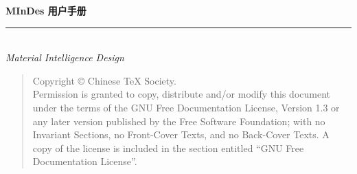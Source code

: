 \thispagestyle{empty}

\noindent\begin{minipage}{\textwidth}
\raggedleft
{\huge \bfseries MInDes 用户手册}
\noindent\rule[-1ex]{\textwidth}{5pt}\\[2.5ex]
\hfill\emph{\Large Material Intelligence Design}
\end{minipage}

\noindent{}


\newpage\thispagestyle{empty}
\begin{quote}\footnotesize
    Copyright \copyright{} {\the\year} Chinese \TeX{} Society. \\
    Permission is granted to copy, distribute and/or modify this document
    under the terms of the GNU Free Documentation License, Version 1.3
    or any later version published by the Free Software Foundation;
    with no Invariant Sections, no Front-Cover Texts, and no Back-Cover Texts.
    A copy of the license is included in the section entitled ``GNU
    Free Documentation License''.
\end{quote}
